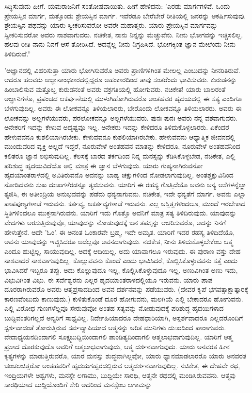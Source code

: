 ಸಿದ್ಧಿಸುವುದು ಹೀಗೆ. ಯಮರಾಜನಿಗೆ ಸಂತೋಷವಾಯಿತು. ಹೀಗೆ ಹೇಳಿದನು: 'ಎರಡು ಮಾರ್ಗಗಳಿವೆ. ಒಂದು ಪ್ರೇಯಸ್ಸಿನ ಮಾರ್ಗ, ಮತ್ತೊಂದು ಶ್ರೇಯಸ್ಸಿನ ಮಾರ್ಗ. ಇವೆರಡೂ ಬೇರೆಬೇರೆ ರೀತಿಯಲ್ಲಿ ಜನರನ್ನು ಆಕರ್ಷಿಸುವುವು. ಶ್ರೇಯಸ್ಸಿನ ಪಥವನ್ನು ಯಾರು ಸ್ವೀಕರಿಸುವರೋ ಅವರೇ ಮಹಾತ್ಮರು. ಯಾರು ಪ್ರೇಯಸ್ಸಿನ ಮಾರ್ಗವನ್ನು ಸ್ವೀಕರಿಸುವರೋ ಅವರು ನಾಶವಾಗುವರು. ನಚಿಕೇತ, ನಾನು ನಿನ್ನನ್ನು ಮೆಚ್ಚುವೆನು. ನೀನು ಭೋಗವನ್ನು ಇಚ್ಚಿಸಲಿಲ್ಲ. ಹಲವು ರೀತಿ ನಾನು ನಿನಗೆ ಆಸೆ ತೋರಿಸಿದೆ. ಅದನ್ನೆಲ್ಲ ನೀನು ನಿಗ್ರಹಿಸಿದೆ. ಭೋಗಕ್ಕಿಂತ ಜ್ಞಾನ ಮೇಲೆಂದು ನೀನು ತಿಳಿದಿರುವೆ.”

'ಅಜ್ಞಾನದಲ್ಲಿ ವಿಹರಿಸುತ್ತಾ ಯಾರು ಭೋಗಿಸುವರೊ ಅವರು ಪ್ರಾಣಿಗಳಿಗಿಂತ ಮೇಲಲ್ಲ ಎಂಬುದನ್ನು ನೀನರಿತಿರುವೆ. ಆದರೂ ಹಲವರು ಅಜ್ಞಾನಾಂಧಕಾರದಲ್ಲಿದ್ದರೂ ಅಹಂಕಾರದಿಂದ ತಾವು ಸಂತರೆಂದು ಭಾವಿಸುವರು. ಕುರುಡನನ್ನು ಹಿಂಬಾಲಿಸುವ ಮತ್ತೊಬ್ಬ ಕುರುಡನಂತೆ ಅವರು ವಕ್ರಗತಿಯಲ್ಲಿ ಹೋಗುವರು. ನಚಿಕೇತ! ಯಾರು ಬಾಲರಂತೆ ಅಜ್ಞಾನಿಗಳೊ, ಪ್ರಪಂಚದ ಆಕರ್ಷಣೆಯಲ್ಲಿ ಮುಳುಗಿಹೋಗಿರುವರೊ ಅಂತಹವರ ಹೃದಯದಲ್ಲಿ ಈ ಸತ್ಯ ಎಂದಿಗೂ ಬೆಳಗುವುದಿಲ್ಲ. ಅವರು ಈ ಲೋಕವನ್ನೂ ತಿಳಿಯಲಾರರು, ಬೇರೊಂದು ಲೋಕವನ್ನೂ ತಿಳಿಯಲಾರರು. ಅವರು ಈ ಲೋಕವನ್ನು ಅಲ್ಲಗಳೆಯುವರು, ಪರಲೋಕವನ್ನೂ ಅಲ್ಲಗಳೆಯುವರು. ಪುನಃ ಪುನಃ ಅವರು ನನ್ನ ವಶವಾಗುವರು. ಅನೇಕರಿಗೆ ಇದನ್ನು ಕೇಳುವ ಅದೃಷ್ಟವೂ ಇಲ್ಲ. ಅನೇಕರು ಇದನ್ನು ಕೇಳಿದರೂ ತಿಳಿದುಕೊಳ್ಳಲಾರರು. ಏಕೆಂದರೆ ಹೇಳುವವನೂ ಕುಶಲಿಯಾಗಿರಬೇಕು. ಕೇಳುವವನೂ ಕುಶಲಿಯಾಗಿರಬೇಕು. ಹೇಳುವವನು ಆಧ್ಯಾತ್ಮಿಕ ಜೀವನದಲ್ಲಿ ಮುಂದುವರಿದ ವ್ಯಕ್ತಿ ಅಲ್ಲದೆ ಇದ್ದರೆ, ನೂರುವೇಳೆ ಅಂತಹವನ ಮಾತನ್ನು ಕೇಳಿದರೂ, ನೂರುವೇಳೆ ಅಂತಹವನಿಂದ ಕಲಿತರೂ ಜ್ಞಾನ ಲಭಿಸುವುದಿಲ್ಲ. ಕೆಲಸಕ್ಕೆ ಬಾರದ ತರ್ಕದಿಂದ ನಿನ್ನ ಮನಸ್ಸನ್ನು ಕೆಡಿಸಿಕೊಳ್ಳಬೇಡ, ನಚಿಕೇತ, ಎಲ್ಲಿ ಪರಿಶುದ್ಧ ಹೃದಯವಿದೆಯೊ ಅಲ್ಲಿ ಮಾತ್ರ ಈ ಜ್ಞಾನ ಬೆಳಗುವುದು. ಯಾರು ಗುಹ್ಯನಾಗಿರುವನೋ ಹೃದಯಾಂತರಾಳದಲ್ಲಿ ಅವಿತಿರುವನೊ ಅವನನ್ನು ಬಾಹ್ಯ ಚಕ್ಷುಗಳಿಂದ ನೋಡಲಾಗುವುದಿಲ್ಲ. ಅಂತಶ್ಚಕ್ಷುವಿನಿಂದ ನೋಡಿದವನು ಸುಖ ದುಃಖಗಳೆರಡನ್ನೂ ತ್ಯಜಿಸುವನು. ಯಾರಿಗೆ ಈ ರಹಸ್ಯ ಗೊತ್ತಿದೆಯೊ ಅವನು ಅನ್ಯ ಆಸೆಗಳನ್ನೆಲ್ಲಾ ತ್ಯಜಿಸಿ, ಈ ಅತೀಂದ್ರಿಯ ಅನುಭವವನ್ನು ಪಡೆದು ಧನ್ಯನಾಗುವನು. ನಚಿಕೇತ, ಇದೇ ಧನ್ಯತೆಗೆ ಮಾರ್ಗ. ಅವನು ಎಲ್ಲಾ ಪಾಪಪುಣ್ಯಗಳಾಚೆ ಇರುವನು. ಕರ್ತವ್ಯ, ಅಕರ್ತವ್ಯಗಳಾಚೆ ಇರುವನು. ಎಲ್ಲ ಅಸ್ತಿತ್ವಗಳಿಂದಲೂ, ಮುಂದೆ ಇರಬೇಕಾದ ಸ್ಥಿತಿಗಳಿಂದಲೂ ಮುಕ್ತನಾಗಿರುವನು. ಯಾರಿಗೆ ಇದು ಗೊತ್ತೊ ಅವನಿಗೆ ಮಾತ್ರ ಸತ್ಯ ತಿಳಿದಿರುವುದು. ಯಾವುದನ್ನು ವೇದಗಳು ಅರಸುತ್ತಿರುವುವೊ, ಯಾವುದನ್ನು ನೋಡುವುದಕ್ಕೆ ಜನ ತಪಸ್ಸನ್ನು ಆಚರಿಸುವರೊ, ಅದನ್ನು ನಿನಗೆ ಹೇಳುತ್ತೇನೆ. ಅದೇ 'ಓಂ'. ಈ ಅನಂತ ಓಂಕಾರವೇ ಬ್ರಹ್ಮ, ಇದೇ ಅಮೃತ. ಯಾರಿಗೆ ಇದರ ರಹಸ್ಯ ತಿಳಿದಿದೆಯೊ, ಅವನು ಯಾವುದನ್ನು ಇಚ್ಚಿಸಿದರೂ ಅದೆಲ್ಲವೂ ಅವನದಾಗುವುದು. ನಚಿಕೇತ, ನೀನು ತಿಳಿದುಕೊಳ್ಳಬೇಕೆಂಬ ಆತ್ಮ ಎಂದೂ ಹುಟ್ಟಿಲ್ಲ, ಸಾಯುವುದಿಲ್ಲ. ಅದಕ್ಕೆ ಆದಿಯಿಲ್ಲ. ಅದು ಯಾವಾಗಲೂ ಇರುವುದು. ಈ ಪುರಾಣ ವಸ್ತು ದೇಹ ನಾಶವಾದರೆ ನಾಶವಾಗುವುದಿಲ್ಲ. ಕೊಲ್ಲುವವನು ಕೊಂದೆ ಎಂದು ಭಾವಿಸಿದರೆ, ಕೊಲ್ಲಿಸಿಕೊಳ್ಳುವವನು ಸತ್ತೆ ಎಂದು ಭಾವಿಸಿದರೆ ಇಬ್ಬರೂ ತಪ್ಪು. ಅದು ಕೊಲ್ಲುವುದೂ ಇಲ್ಲ, ಕೊಲ್ಲಿಸಿಕೊಳ್ಳುವುದೂ ಇಲ್ಲ. ಅಣುವಿಗಿಂತ ಅಣು ಇದು, ವಿಭುವಿಗಿಂತ ವಿಭು. ಈ ಸರ್ವೆಶ್ವರನು ಎಲ್ಲರ ಹೃದಯಾಂತರಾಳದಲ್ಲಿಯೂ ಇರುವನು. ಯಾರು ಪಾಪ ದೂರರಾಗಿರುವರೊ ಅವರು ಆತ್ಮಪ್ರಸಾದದಿಂದ ಅವನ ದರ್ಶನವನ್ನು ಪಡೆಯುವರು. (ದೇವರ ಕೃಪೆ ಭಗವತ್ಸಾಕ್ಷಾತ್ಕಾರಕ್ಕೆ ಕಾರಣವೆಂಬುದು ಕಾಣುವುದು.) ಕುಳಿತುಕೊಂಡೆ ದೂರ ಹೋಗುವನು, ಮಲಗಿಯೆ ಎಲ್ಲಿ ಬೇಕಾದರೂ ಹೋಗುವನು. ಎಲ್ಲಿ ವಿರೋಧ ಗುಣಗಳೆಲ್ಲವೂ ಸೇರುವುವೋ ಅಂತಹ ಸತ್ಯವನ್ನು ನೋಡುವುದಕ್ಕೆ ಪರಿಶುದ್ಧ ಹೃದಯಿಗಳಾದ ಬುದ್ದಿವಂತರಿಗಲ್ಲದೆ ಅನ್ಯರಿಗೆ ಸಾಧ್ಯವಿಲ್ಲ. ನಿರ್ದೇಹಿಯಾದರೂ ದೇಹಧಾರಿಯಾಗಿ, ಅಸ್ಪರ್ಶವಾದರೂ ಎಲ್ಲದರೊಂದಿಗೆ ಸ್ಪರ್ಶವಾದಂತೆ ತೋರುತ್ತಿರುವ ಸರ್ವವ್ಯಾಪಿಯಾದ ಆತ್ಮನನ್ನು ಅರಿತ ಮುನಿಗಳು ದುಃಖದಿಂದ ಪಾರಾಗುವರು. ವೇದಾಧ್ಯಯನದಿಂದಾಗಲಿ ಸೂಕ್ಷ್ಮಬುದ್ದಿಯಿಂದಾಗಲಿ ಪಾಂಡಿತ್ಯದಿಂದಾಗಲಿ ಆತ್ಮಲಾಭವಾಗುವುದಿಲ್ಲ. ಯಾರಿಗೆ ಆತ್ಮ ಪ್ರಸಾದ ದೊರಕುವುದೊ ಅವರಿಗೆ ಆತ್ಮಲಾಭವಾಗುವುದು, ಆತ್ಮ ದರ್ಶನವಾಗುವುದು. ಯಾರು ಅನವರತ ಹೀನ ಕೃತ್ಯಗಳನ್ನು ಮಾಡುತ್ತಿರುವರೊ, ಯಾರ ಮನಸ್ಸು ಶುದ್ಧವಾಗಿಲ್ಲವೋ, ಯಾರು ಧ್ಯಾನಮಾಡಲಾರರೊ ಯಾರು ಅನವರತ ಚಂಚಲಚಿತ್ತರೋ ಅಂತಹವರಿಗೆ ಹೃದಯಗಹ್ವರದಲ್ಲಿರುವ ಆತ್ಮದರ್ಶನವಾಗುವುದಿಲ್ಲ. ನಚಿಕೇತ, ಈ ದೇಹವೇ ರಥ, ಇಂದ್ರಿಯಗಳೇ ಅಶ್ವಗಳು, ಮನಸ್ಸೇ ಲಗಾಮು, ಬುದ್ದಿಯೇ ಸಾರಥಿ, ಆತ್ಮನೇ ರಥದಲ್ಲಿ ಮಂಡಿಸಿರುವವನು. ಆತ್ಮವು ಸಾರಥಿಯಾದ ಬುದ್ದಿಯೊಂದಿಗೆ ಸೇರಿ ಅದರಿಂದ ಮನಸ್ಸೆಂಬ ಲಗಾಮನ್ನು 